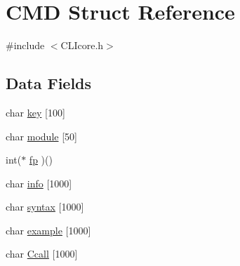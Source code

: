 \hypertarget{structCMD}{\section{C\+M\+D Struct Reference}
\label{structCMD}
}


{\ttfamily \#include $<$C\+L\+Icore.\+h$>$}

\subsection*{Data Fields}
\begin{DoxyCompactItemize}
\item 
char \hyperlink{structCMD_a208433b07e89cca90d13c52613fe897f}{key} \mbox{[}100\mbox{]}
\item 
char \hyperlink{structCMD_af59d856e468e0d279c6b0e49db4f0cc5}{module} \mbox{[}50\mbox{]}
\item 
int($\ast$ \hyperlink{structCMD_aedabad6607de51038f6355b9adfae55c}{fp} )()
\item 
char \hyperlink{structCMD_aecf0315d4d31f9f0821c370532604a54}{info} \mbox{[}1000\mbox{]}
\item 
char \hyperlink{structCMD_a3e3d8583f95573d025daacb98b25e8e6}{syntax} \mbox{[}1000\mbox{]}
\item 
char \hyperlink{structCMD_a64cbd1d4ac5f0438bdab661e62d47f93}{example} \mbox{[}1000\mbox{]}
\item 
char \hyperlink{structCMD_acc8ecba736894c2abe1da739bb1bb850}{Ccall} \mbox{[}1000\mbox{]}
\end{DoxyCompactItemize}


